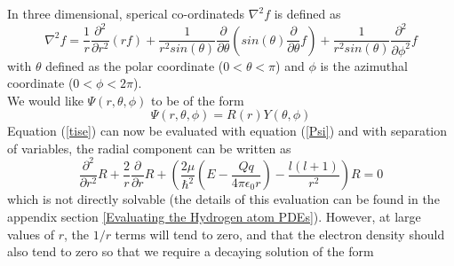 \documentclass[12pt,a4paper]{report}
\begin{document}
	In three dimensional, sperical co-ordinateds $\nabla^2 f$ is defined as
	\begin{equation}
		\nabla^2 f = \frac{1}{r}\frac{\partial^2}{\partial r^2} \left( rf \right) + \frac{1}{r^2 sin\left(\theta\right)}\frac{\partial}{\partial\theta}\left(sin\left(\theta\right)\frac{\partial}{\partial\theta}f\right) + \frac{1}{r^2 sin\left(\theta\right)}\frac{\partial^2}{\partial\phi^2}f
	\end{equation}
	with $\theta$ defined as the polar coordinate ($0<\theta<\pi$) and $\phi$ is the azimuthal coordinate ($0<\phi<2\pi$).\\
	We would like $\Psi \left( r,\theta,\phi \right)$ to be of the form
	\begin{equation}
		\label{Psi}
		\Psi \left( r,\theta,\phi \right) = R\left(r\right)Y\left(\theta,\phi\right)
	\end{equation}
	Equation (\ref{tise}) can now be evaluated with equation (\ref{Psi}) and with separation of variables, the radial component can be written as
	\begin{equation}
		\label{radial_component}
		\frac{\partial^2}{\partial r^2}R+\frac{2}{r}\frac{\partial}{\partial r}R+\left(\frac{2\mu}{\hbar^2}\left(E-\frac{Qq}{4\pi\epsilon_0 r}\right)-\frac{l\left(l+1\right)}{r^2}\right)R=0
	\end{equation}
%
%
	which is not directly solvable (the details of this evaluation can be found in the appendix section \ref{Evaluating the Hydrogen atom PDEs}). However, at large values of $r$, the $1/r$ terms will tend to zero, and that the electron density should also tend to zero so that we require a decaying solution of the form
\end{document}
